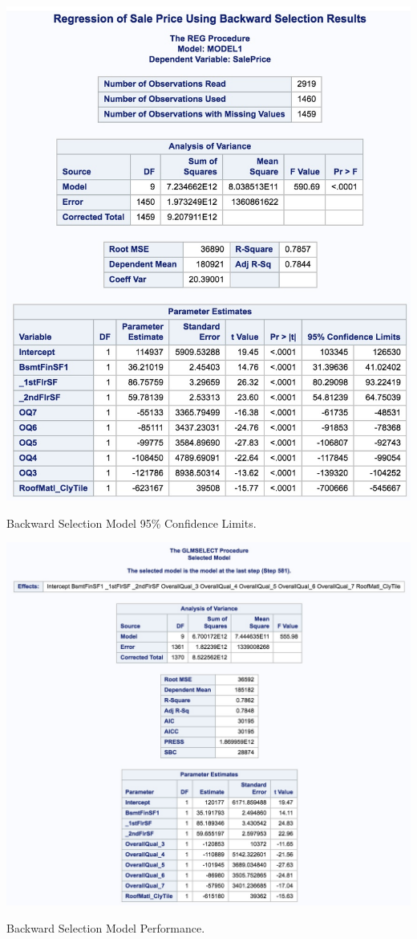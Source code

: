 \documentclass[11pt]{scrartcl} %
\begin{document}
\hrulefill
\begin{table}[H] %
	\centering %
	\includegraphics[scale=.3]{../graphics/A2BWCI}
	\caption{Backward Selection Model 95\% Confidence Limits.} %
	\label{tab:A2BWCI}
\end{table}
\hrulefill
\begin{table}[H] %
	\centering %
	\includegraphics[scale=.3]{../graphics/A2BWresults}
	\caption{Backward Selection Model Performance.} %
	\label{tab:A2BWperf}
\end{table}
\end{document}
